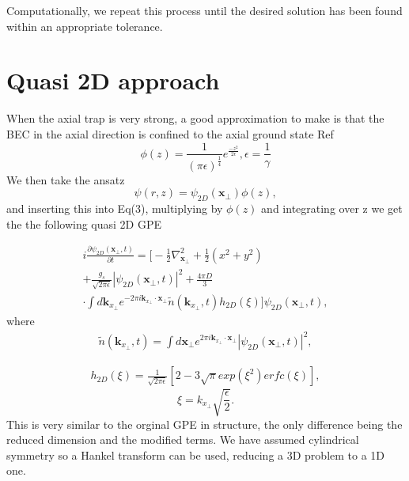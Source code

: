 \documentclass[10pt]{article}
\numberwithin{equation}{section}
\begin{document}
\begin{multicols}{2}
Computationally, we repeat this process until the desired solution has been found within an appropriate tolerance.

\section{Quasi 2D approach}
When the axial trap is very strong, a good approximation to make is that the BEC in the axial direction is confined to the axial ground state Ref\cite{KUMAR2015117}
 \begin{equation}
\phi(z) = \frac{1}{(\pi\epsilon)^{\frac{1}{4}}}e^{\frac{-z^{2}}{2\epsilon}}, \epsilon = \frac{1}{\gamma}
\end{equation}
We then take the ansatz 
 \begin{equation}
\psi(r,z) = \psi_{2D}(\textbf{x}_{\perp})\phi(z),
\end{equation}
and inserting this into Eq(3), multiplying by $\phi(z)$ and integrating over z we get the the following quasi 2D GPE




\begin{multline}
i\frac{\partial \psi_{2D}(\textbf{x}_{\perp},t)}{\partial t}=\bigg[-\frac{1}{2}\nabla_{\textbf{x}_{\perp}}^2 + \frac{1}{2}(x^2+y^2) \\+\frac{g_{s}}{\sqrt{2\pi\epsilon}}|\psi_{2D}(\textbf{x}_{\perp},t)|^2
+\frac{4\pi D}{3}\\\cdot\int d\textbf{k}_{x_{\perp}}e^{-2\pi i\textbf{k}_{x_{\perp}}\cdotp \textbf{x}_{\perp}}\tilde{n}(\textbf{k}_{x_{\perp}},t)h_{2D}(\xi)\bigg]\psi_{2D}(\textbf{x}_{\perp},t),
\end{multline}
where 
\begin{multline}
\tilde{n}(\textbf{k}_{x_{\perp}},t) = \int d\textbf{x}_{\perp}e^{2\pi i\textbf{k}_{x_{\perp}}\cdotp \textbf{x}_{\perp}}|\psi_{2D}(\textbf{x}_{\perp},t)|^2,
\end{multline}

\begin{multline}
h_{2D}(\xi)=\frac{1}{\sqrt{2\pi\epsilon}}[2-3\sqrt{\pi}exp(\xi^2)erfc(\xi)],              
\end{multline}
\begin{equation}
\xi = k_{x_{\perp}}\sqrt{\frac{\epsilon}{2}}.             
\end{equation}
This is very similar to the orginal GPE in structure, the only difference being the reduced dimension and the modified terms. We have assumed cylindrical symmetry so a Hankel transform can be used, reducing a 3D problem to a 1D one. 


\end{multicols}
\end{document}
